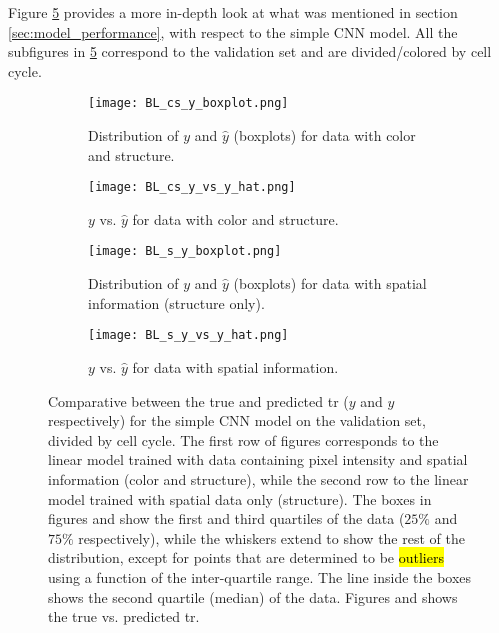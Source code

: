 
\glsresetall
\graphicspath{{./Sections/Results/Resources/}}


Figure \ref{fig:results:bl_performance} provides a more in-depth look at what was mentioned in section \ref{sec:model_performance}, with respect to the simple CNN model. All the subfigures in \ref{fig:results:bl_performance} correspond to the validation set and are divided/colored by cell cycle.

\begin{figure}[!ht]
  \centering
  \begin{subfigure}[b]{.5\linewidth}
    \texttt{[image: BL\_cs\_y\_boxplot.png]}
    \caption{Distribution of $y$ and $\hat{y}$ (boxplots) for data with color and structure.}
    \label{fig:results:bl_performance:cs_dist}
  \end{subfigure}
  \begin{subfigure}[b]{.27\linewidth}
    \texttt{[image: BL\_cs\_y\_vs\_y\_hat.png]}
    \caption{$y$ vs. $\hat{y}$ for data with color and structure.}
    \label{fig:results:bl_performance:cs_y_vs_y_hat}
  \end{subfigure}%
  \vspace{3mm}
  \begin{subfigure}[b]{.5\linewidth}
    \texttt{[image: BL\_s\_y\_boxplot.png]}
    \caption{Distribution of $y$ and $\hat{y}$ (boxplots) for data with spatial information (structure only).}
    \label{fig:results:bl_performance:s_dist}
  \end{subfigure}
  \begin{subfigure}[b]{.27\linewidth}
    \texttt{[image: BL\_s\_y\_vs\_y\_hat.png]}
    \caption{$y$ vs. $\hat{y}$ for data with spatial information.}
    \label{fig:results:bl_performance:s_y_vs_y_hat}
  \end{subfigure}
  \caption{Comparative between the true and predicted \gls{tr} ($y$ and $\hat{y}$ respectively) for the simple CNN model on the validation set, divided by cell cycle. The first row of figures corresponds to the linear model trained with data containing pixel intensity and spatial information (color and structure), while the second row to the linear model trained with spatial data only (structure). The boxes in figures  and  show the first and third quartiles of the data ($25\%$ and $75\%$ respectively), while the whiskers extend to show the rest of the distribution, except for points that are determined to be \hl{outliers} using a function of the inter-quartile range. The line inside the boxes shows the second quartile (median) of the data. Figures  and  shows the true vs. predicted \gls{tr}.}
  \label{fig:results:bl_performance}
\end{figure}

